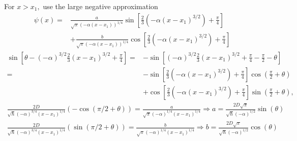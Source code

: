 \begin{enumerate}
    For $x>x_1,$ use the large negative approximation
    \begin{align*}
        \psi(x)=&\frac{a}{\sqrt{\pi}(-\alpha(x-x_1))^{1/4}}
        \sin\left[
        \frac{2}{3}(-\alpha(x-x_1)^{3/2})+\frac{\pi}{4}
        \right]\\
        &+ \frac{b}{\sqrt{\pi}(-\alpha(x-x_1))^{1/4}}
        \cos\left[
        \frac{2}{3}(-\alpha(x-x_1)^{3/2})+\frac{\pi}{4}
        \right]
    \end{align*}
    \begin{align*}
        \sin\left[
        \theta-(-\alpha)^{3/2}\frac{2}{3}(x-x_1)^{3/2}+\frac{\pi}{4}
        \right]
        =&-\sin\left[
        (-\alpha)^{3/2}\frac{2}{3}(x-x_1)^{3/2}+\frac{\pi}{4}-\frac{\pi}{2}-\theta
        \right]\\
        =&
        -\sin\left[
        \frac{2}{3}(-\alpha(x-x_1)^{3/2})+
        \frac{\pi}{4}
        \right]\cos(\frac{\pi}{2}+\theta)
        \\
        &+
        \cos\left[
        \frac{2}{3}(-\alpha(x-x_1)^{3/2})+\frac{\pi}{4}
        \right]
        \sin(\frac{\pi}{2}+\theta),
    \end{align*}
    \begin{align*}
        \frac{2D}{\sqrt{\hbar}(-\alpha)^{3/4}(x-x_1)^{1/4}}
        (-\cos(\pi/2+\theta))
        =\frac{a}{\sqrt{\pi}(-\alpha)^{1/4}(x-x_1)^{1/4}}
        \Rightarrow
        a = \frac{2D\sqrt{\pi}}{\sqrt{\hbar}(-\alpha)^{1/2}}\sin(\theta)
    \end{align*}
    \begin{align*}
        \frac{2D}{\sqrt{\hbar}(-\alpha)^{3/4}(x-x_1)^{1/4}}
        (\sin(\pi/2+\theta))
        =\frac{b}{\sqrt{\pi}(-\alpha)^{1/4}(x-x_1)^{1/4}}
        \Rightarrow
        b = \frac{2D\sqrt{\pi}}{\sqrt{\hbar}(-\alpha)^{1/2}}\cos(\theta)
    \end{align*}


\end{enumerate}
